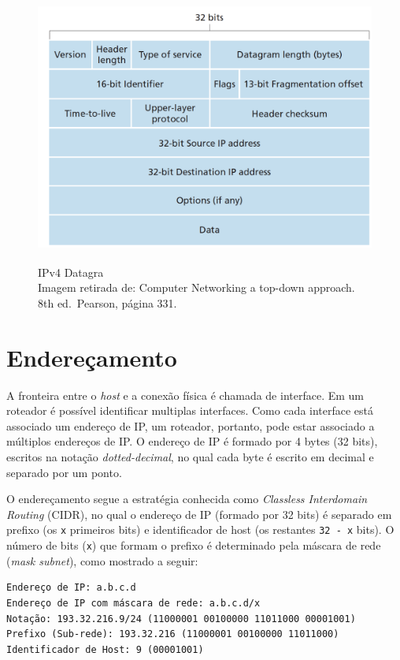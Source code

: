 \begin{figure}[h!]
\centering
\includegraphics[keepaspectratio, width=12cm, height=9cm]{imagens/13/13 - IPv4 Datagram.png}
\caption{IPv4 Datagra \\
Imagem retirada de: Computer Networking a top-down approach. 8th
ed.~Pearson, página 331. \\}
\label{IPv4 Datagra }
\end{figure}





\hypertarget{endereuxe7amento}{%
\section{Endereçamento}\label{endereuxe7amento}}

A fronteira entre o \emph{host} e a conexão física é chamada de
interface. Em um roteador é possível identificar multiplas interfaces.
Como cada interface está associado um endereço de IP, um roteador,
portanto, pode estar associado a múltiplos endereços de IP. O endereço
de IP é formado por 4 bytes (32 bits), escritos na notação
\emph{dotted-decimal}, no qual cada byte é escrito em decimal e separado
por um ponto.

O endereçamento segue a estratégia conhecida como \emph{Classless
Interdomain Routing} (CIDR), no qual o endereço de IP (formado por 32
bits) é separado em prefixo (os \texttt{x} primeiros bits) e
identificador de host (os restantes \texttt{32\ -\ x} bits). O número de
bits (\texttt{x}) que formam o prefixo é determinado pela máscara de
rede (\emph{mask subnet}), como mostrado a seguir:

\begin{verbatim}
Endereço de IP: a.b.c.d
Endereço de IP com máscara de rede: a.b.c.d/x
Notação: 193.32.216.9/24 (11000001 00100000 11011000 00001001)
Prefixo (Sub-rede): 193.32.216 (11000001 00100000 11011000)
Identificador de Host: 9 (00001001)
\end{verbatim}

